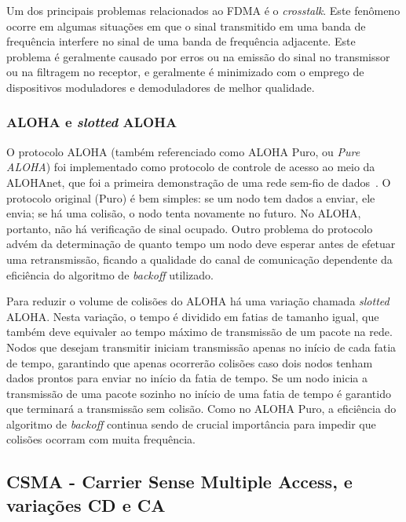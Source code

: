 Um dos principais problemas relacionados ao FDMA é o \textit{crosstalk}. Este
fenômeno ocorre em algumas situações em que o sinal transmitido em uma banda de
frequência interfere no sinal de uma banda de frequência adjacente. Este
problema é geralmente causado por erros ou na emissão do sinal no transmissor ou
na filtragem no receptor, e geralmente é minimizado com o emprego de
dispositivos moduladores e demoduladores de melhor qualidade.

\subsubsection{ALOHA e \textit{slotted} ALOHA}

O protocolo ALOHA (também referenciado como ALOHA Puro, ou \textit{Pure ALOHA})
foi implementado como protocolo de controle de acesso ao meio da ALOHAnet, que
foi a primeira demonstração de uma rede sem-fio de dados~\cite{Abramson:1970}. O
protocolo original (Puro) é bem simples: se um nodo tem dados a enviar, ele
envia; se há uma colisão, o nodo tenta novamente no futuro. No ALOHA, portanto,
não há verificação de sinal ocupado. Outro problema do protocolo advém da
determinação de quanto tempo um nodo deve esperar antes de efetuar uma
retransmissão, ficando a qualidade do canal de comunicação dependente da
eficiência do algoritmo de \textit{backoff} utilizado.

Para reduzir o volume de colisões do ALOHA há uma variação chamada
\textit{slotted} ALOHA. Nesta variação, o tempo é dividido em fatias de tamanho
igual, que também deve equivaler ao tempo máximo de transmissão de um pacote na
rede. Nodos que desejam transmitir iniciam transmissão apenas no início de cada
fatia de tempo, garantindo que apenas ocorrerão colisões caso dois nodos tenham
dados prontos para enviar no início da fatia de tempo. Se um nodo inicia a
transmissão de uma pacote sozinho no início de uma fatia de tempo é garantido
que terminará a transmissão sem colisão. Como no ALOHA Puro, a eficiência do
algoritmo de \textit{backoff} continua sendo de crucial importância para impedir
que colisões ocorram com muita frequência.


\subsection{CSMA - Carrier Sense Multiple Access, e variações CD e CA}

